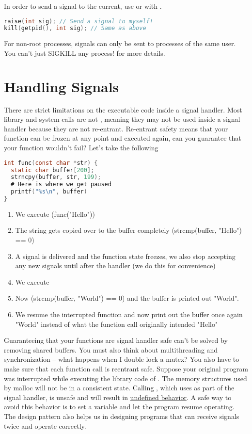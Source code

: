In order to send a signal to the current, use  or  with .

\begin{lstlisting}[language=C]
raise(int sig); // Send a signal to myself!
kill(getpid(), int sig); // Same as above
\end{lstlisting}

For non-root processes, signals can only be sent to processes of the same user.
You can't just SIGKILL any process!
 for more details.

\section{Handling Signals}

There are strict limitations on the executable code inside a \gls{signal handler}.
Most library and system calls are not , meaning they may not be used inside a signal handler because they are not re-entrant.
Re-entrant safety means that your function can be frozen at any point and executed again, can you guarantee that your function wouldn't fail?
Let's take the following

\begin{lstlisting}[language=C]
int func(const char *str) {
  static char buffer[200];
  strncpy(buffer, str, 199);
  # Here is where we get paused
  printf("%s\n", buffer)
}
\end{lstlisting}

\begin{enumerate}
\item We execute \keyword(func("Hello"))
\item The string gets copied over to the buffer completely (strcmp(buffer, "Hello") == 0)
\item A signal is delivered and the function state freezes, we also stop accepting any new signals until after the handler (we do this for convenience)
\item We execute 
\item Now (strcmp(buffer, "World") == 0) and the buffer is printed out "World".
\item We resume the interrupted function and now print out the buffer once again "World" instead of what the function call originally intended "Hello"
\end{enumerate}

Guaranteeing that your functions are signal handler safe can't be solved by removing shared buffers.
You must also think about multithreading and synchronization -- what happens when I double lock a mutex?
You also have to make sure that each function call is reentrant safe.
Suppose your original program was interrupted while executing the library code of .
The memory structures used by malloc will not be in a consistent state.
Calling , which uses  as part of the signal handler, is unsafe and will result in \underline{undefined behavior}.
A safe way to avoid this behavior is to set a variable and let the program resume operating.
The design pattern also helps us in designing programs that can receive signals twice and operate correctly.

